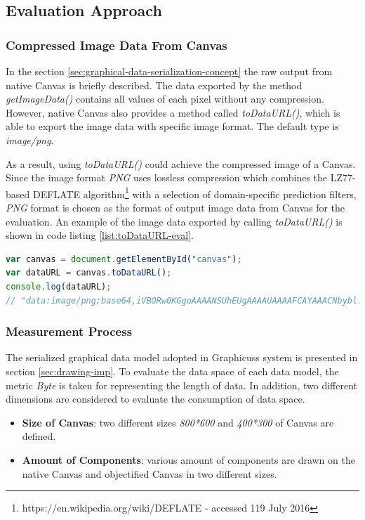 
\subsection{Evaluation Approach}

\subsubsection{Compressed Image Data From Canvas}
In the section \ref{sec:graphical-data-serialization-concept} the raw output from native Canvas is briefly described. The data exported by the method \textit{getImageData()} contains all values of each pixel without any compression. However, native Canvas also provides a method called \textit{toDataURL()}, which is able to export the image data with specific image format. The default type is \textit{image/png}.

As a result, using \textit{toDataURL()} could achieve the compressed image  of a Canvas. Since the image format \textit{PNG} uses lossless compression which combines the LZ77-based DEFLATE algorithm\footnote{https://en.wikipedia.org/wiki/DEFLATE - accessed 119 July 2016} with a selection of domain-specific prediction filters, \textit{PNG} format is chosen as the format of output image data  from Canvas for the evaluation\cite{barron1998minimum}. An example of the image data exported by calling \textit{toDataURL()} is shown in code listing \ref{list:toDataURL-eval}.


\begin{lstlisting}[language=JavaScript, caption=Example of image data while calling toDataURL() , label={list:toDataURL-eval}]
var canvas = document.getElementById("canvas");
var dataURL = canvas.toDataURL();
console.log(dataURL);
// "data:image/png;base64,iVBORw0KGgoAAAANSUhEUgAAAAUAAAAFCAYAAACNbybl...ADElEQVQImWNgoBMAAABpAAFEI8ARAAAAAElFTkSuQmCC"
\end{lstlisting}

\subsubsection{Measurement Process}
The serialized graphical data model adopted in Graphicuss system is presented in section \ref{sec:drawing-imp}. To evaluate the data space of each data model, the metric \textit{Byte} is taken for representing the length of data. In addition, two different dimensions are considered to evaluate the consumption of data space.

\begin{itemize}
  \item \textbf{Size of Canvas}: two different sizes \textit{800*600} and \textit{400*300} of Canvas are defined.
  \item \textbf{Amount of Components}: various amount of components are drawn on the native Canvas and objectified Canvas in two different sizes.
\end{itemize}

